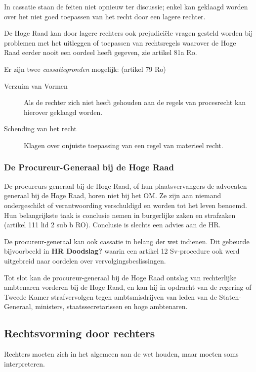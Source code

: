 \documentclass{article}
\begin{document}
In cassatie staan de feiten niet opnieuw ter discussie; enkel kan geklaagd
worden over het niet goed toepassen van het recht door een lagere rechter.

De Hoge Raad kan door lagere rechters ook prejudiciële vragen gesteld worden
bij problemen met het uitleggen of toepassen van rechtsregels waarover de Hoge
Raad eerder nooit een oordeel heeft gegeven, zie artikel 81a Ro.

Er zijn twee \emph{cassatiegronden} mogelijk: (artikel 79 Ro)

\begin{description}
  \item[Verzuim van Vormen] Als de rechter zich niet heeft gehouden aan de regels van
    procesrecht kan hierover geklaagd worden.
  \item[Schending van het recht] Klagen over onjuiste toepassing van een regel van
    materieel recht.
\end{description}

\subsubsection{De Procureur-Generaal bij de Hoge Raad}

De procureurs-generaal bij de Hoge Raad, of hun plaatsvervangers de
advocaten-generaal bij de Hoge Raad, horen niet bij het OM. Ze zijn aan niemand
ondergeschikt of verantwoording verschuldigd en worden tot het leven benoemd.
Hun belangrijkste taak is conclusie nemen in burgerlijke zaken en strafzaken
(artikel 111 lid 2 sub b RO). Conclusie is slechts een advies aan de HR.

De procureur-generaal kan ook cassatie in belang der wet indienen. Dit gebeurde
bijvoorbeeld in \textbf{HR Doodslag?} waarin een artikel 12 Sv-procedure ook
werd uitgebreid naar oordelen over vervolgingsbeslissingen.

Tot slot kan de procureur-generaal bij de Hoge Raad ontslag van rechterlijke
ambtenaren vorderen bij de Hoge Raad, en kan hij in opdracht van de regering of
Tweede Kamer strafvervolgen tegen ambtsmisdrijven van leden van de
Staten-Generaal, ministers, staatssecretarissen en hoge ambtenaren.

\subsection{Rechtsvorming door rechters}

Rechters moeten zich in het algemeen aan de wet houden, maar moeten soms interpreteren.
\end{document}
